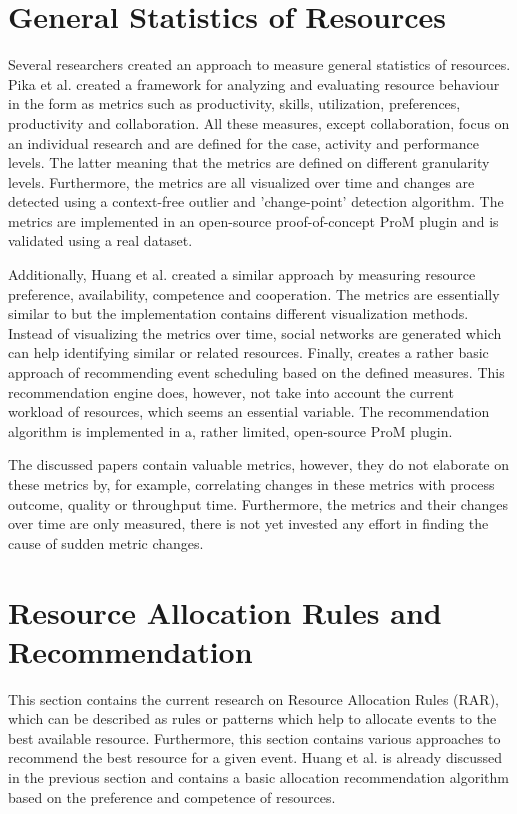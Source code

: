 \section{General Statistics of Resources} \label{section:generalstatistics}
Several researchers created an approach to measure general statistics of resources. Pika et al. \cite{Pika2015,Pika2017} created a framework for analyzing and evaluating resource behaviour in the form as metrics such as productivity, skills, utilization, preferences, productivity and collaboration. All these measures, except collaboration, focus on an individual research and are defined for the case, activity and performance levels. The latter meaning that the metrics are defined on different granularity levels. Furthermore, the metrics are all visualized over time and changes are detected using a context-free outlier and 'change-point' detection algorithm. The metrics are implemented in an open-source proof-of-concept ProM plugin and is validated using a real dataset. 

Additionally, Huang et al. \cite{Huang2012} created a similar approach by measuring resource preference, availability, competence and cooperation. The metrics are essentially similar to \cite{Pika2015,Pika2017} but the implementation contains different visualization methods. Instead of visualizing the metrics over time, social networks are generated which can help identifying similar or related resources. Finally, \cite{Huang2012} creates a rather basic approach of recommending event scheduling based on the defined measures. This recommendation engine does, however, not take into account the current workload of resources, which seems an essential variable. The recommendation algorithm is implemented in a, rather limited, open-source ProM plugin.


\cite{Nakatumba2013} 
The discussed papers contain valuable metrics, however, they do not elaborate on these metrics by, for example, correlating changes in these metrics with process outcome, quality or throughput time. Furthermore, the metrics and their changes over time are only measured, there is not yet invested any effort in finding the cause of sudden metric changes.  

\section{Resource Allocation Rules and Recommendation} \label{section:allocation}
This section contains the current research on Resource Allocation Rules (RAR), which can be described as rules or patterns which help to allocate events to the best available resource. Furthermore, this section contains various approaches to recommend the best resource for a given event. Huang et al. \cite{Huang2012} is already discussed in the previous section and contains a basic allocation recommendation algorithm based on the preference and competence of resources. 

